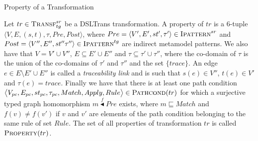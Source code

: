 \begin{definition}{Property of a Transformation\\}
\label{def:trans_prop}

    
Let $tr\in \textsc{Transf}^{sr}_{tg}$ be a DSLTrans transformation. A property of $tr$ is a 6-tuple $\langle V,E,(s,t),\tau,Pre,Post\rangle$, where $Pre = \langle V',E',st',\tau'\rangle \in \textsc{Ipattern}^{sr}$ and $Post = \langle V'',E'',st''\tau''\rangle \in\\ \textsc{Ipattern}^{tg}$ are indirect metamodel patterns. We also have that $V=V'\cup V''$, $E\subseteq E'\cup E''$ and $\tau\subseteq \tau'\cup \tau''$, where the co-domain of $\tau$ is the union of the co-domains of $\tau'$ and $\tau''$ and the set $\{trace\}$. An edge $e \in E\setminus E'\cup E''$ is called a \emph{traceability link} and is such that $s(e)\in V''$, $t(e)\in V'$ and $\tau(e)=trace$. Finally we have that there is at least one path condition $\big\langle V_{pc},E_{pc},st_{pc},\tau_{pc}, Match,Apply,Rule\big\rangle\in \textsc{Pathcond}(tr)$ for which a surjective typed graph homomorphism $m\stackrel{f}{\blacktriangleleft} Pre$ exists, where $m\sqsubseteq Match$ and $f(v)\neq f(v')$ if $v$ and $v'$ are elements of the path condition belonging to the same rule of set $Rule$. The set of all properties of transformation $tr$ is called $\textsc{Property}(tr)$.

\end{definition}



